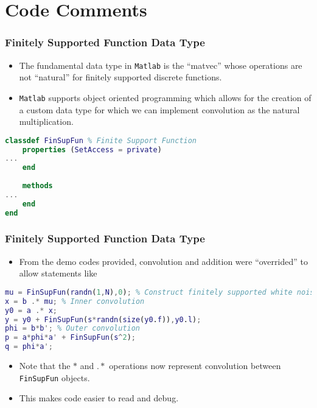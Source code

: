 \documentclass[t]{beamer}
\begin{document}
\section{Code Comments}
\begin{frame}[fragile]
\frametitle{ Finitely Supported Function Data Type }
\begin{itemize}
  \item The fundamental data type in \texttt{Matlab} is the ``matvec'' whose operations are not ``natural'' for finitely supported discrete functions. 
  \item \texttt{Matlab} supports object oriented programming which allows for the creation of a custom data type for which we can implement convolution as the natural multiplication.
\end{itemize}
% 
\begin{lstlisting}[language=Matlab]
classdef FinSupFun % Finite Support Function
    properties (SetAccess = private)
...
    end
    
    methods
...
    end
end
\end{lstlisting}
\end{frame}
\begin{frame}[fragile]
\frametitle{ Finitely Supported Function Data Type }
\begin{itemize}
  \item From the demo codes provided, convolution and addition were ``overrided'' to allow statements like
\end{itemize}
% 
\begin{lstlisting}[language=Matlab,basicstyle=\footnotesize]
mu = FinSupFun(randn(1,N),0); % Construct finitely supported white noise
x = b .* mu; % Inner convolution
y0 = a .* x; 
y = y0 + FinSupFun(s*randn(size(y0.f)),y0.l); 
phi = b*b'; % Outer convolution
p = a*phi*a' + FinSupFun(s^2); 
q = phi*a'; 
\end{lstlisting}
\begin{itemize}
  \item Note that the $*$ and $.*$ operations now represent convolution between \texttt{FinSupFun} objects.
  \item This makes code easier to read and debug.
\end{itemize}
\end{frame}
\end{document}
